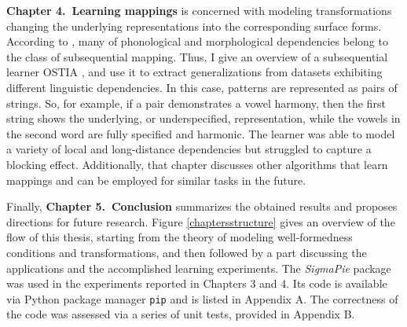 \textbf{Chapter 4.\ Learning mappings} is concerned with modeling transformations changing the underlying representations into the corresponding surface forms.
According to \cite{Chandlee2014}, many of phonological and morphological dependencies belong to the class of subsequential mapping.
Thus, I give an overview of a subsequential learner OSTIA \citep{OncinaEtAl1993,DeLaHiguera2010}, and use it to extract generalizations from datasets exhibiting different linguistic dependencies.
In this case, patterns are represented as pairs of strings.
So, for example, if a pair demonstrates a vowel harmony, then the first string shows the underlying, or underspecified, representation, while the vowels in the second word are fully specified and harmonic.
The learner was able to model a variety of local and long-distance dependencies but struggled to capture a blocking effect.
Additionally, that chapter discusses other algorithms that learn mappings and can be employed for similar tasks in the future.


Finally, \textbf{Chapter 5.\ Conclusion} summarizes the obtained results and proposes directions for future research.
Figure \ref{chaptersstructure} gives an overview of the flow of this thesis, starting from the theory of modeling well-formedness conditions and transformations, and then followed by a part discussing the applications and the accomplished learning experiments.
The \emph{SigmaPie} package was used in the experiments reported in Chapters 3 and 4.
Its code is available via Python package manager \texttt{pip} and is listed in Appendix A.
The correctness of the code was assessed via a series of unit tests, provided in Appendix B.



